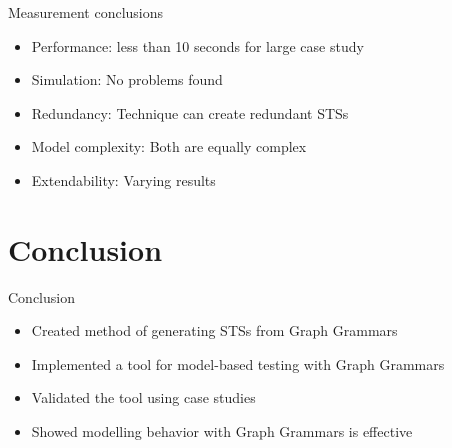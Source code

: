 \documentclass{FMTslides}
\begin{document}
\begin{frame}{Measurement conclusions}
  \begin{itemize}
  \item Performance: less than 10 seconds for large case study
  \item Simulation: No problems found
  \item Redundancy: Technique can create redundant STSs
  \item Model complexity: Both are equally complex
  \item Extendability: Varying results
  \end{itemize}
\end{frame}

\section[Conclusion]{Conclusion}

\begin{frame}{Conclusion}
  \begin{itemize}
    \item Created method of generating STSs from Graph Grammars
    \item Implemented a tool for model-based testing with Graph Grammars
    \item Validated the tool using case studies
    \item Showed modelling behavior with Graph Grammars is effective
  \end{itemize}
\end{frame}
\end{document}
